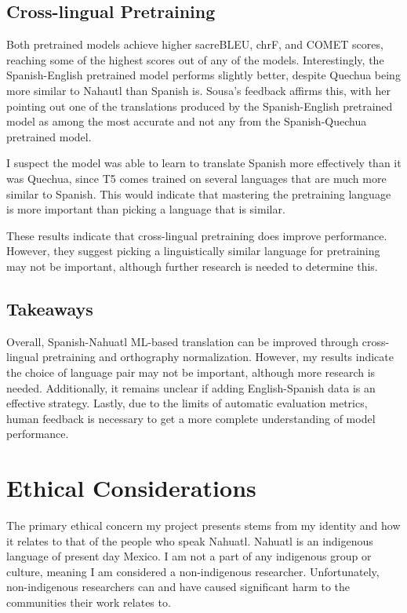 \documentclass[10pt,twocolumn]{article}
\begin{document}
\subsection{Cross-lingual Pretraining}
Both pretrained models achieve higher sacreBLEU, chrF, and COMET scores, reaching some of the highest scores out of any of the models. Interestingly, the Spanish-English pretrained model performs slightly better, despite Quechua being more similar to Nahautl than Spanish is. Sousa's feedback affirms this, with her pointing out one of the translations produced by the Spanish-English pretrained model as among the most accurate and not any from the Spanish-Quechua pretrained model. 

I suspect the model was able to learn to translate Spanish more effectively than it was Quechua, since T5 comes trained on several languages that are much more similar to Spanish. This would indicate that mastering the pretraining language is more important than picking a language that is similar. 

These results indicate that cross-lingual pretraining does improve performance. However, they suggest picking a linguistically similar language for pretraining may not be important, although further research is needed to determine this. 

\subsection{Takeaways}
Overall, Spanish-Nahuatl ML-based translation can be improved through cross-lingual pretraining and orthography normalization. However, my results indicate the choice of language pair may not be important, although more research is needed. Additionally, it remains unclear if adding English-Spanish data is an effective strategy. Lastly, due to the limits of automatic evaluation metrics, human feedback is necessary to get a more complete understanding of model performance.


\section{Ethical Considerations}
    The primary ethical concern my project presents stems from my identity and how it relates to that of the people who speak Nahuatl. Nahuatl is an indigenous language of present day Mexico. I am not a part of any indigenous group or culture, meaning I am considered a non-indigenous researcher. Unfortunately, non-indigenous researchers can and have caused significant harm to the communities their work relates to. 
\end{document}
